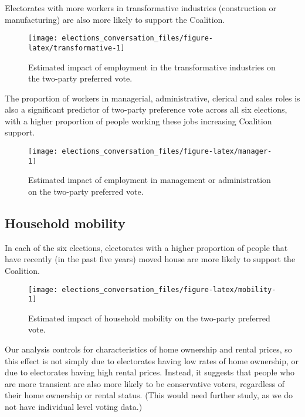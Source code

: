 \documentclass[11pt,a4paper,]{article}
\begin{document}
Electorates with more workers in transformative industries (construction or manufacturing) are also more likely to support the Coalition.

\begin{figure}[H]

{\centering \texttt{[image: elections\_conversation\_files/figure-latex/transformative-1]} 

}

\caption{Estimated impact of employment in the transformative industries on the two-party preferred vote.}\label{fig:transformative}
\end{figure}

The proportion of workers in managerial, administrative, clerical and sales roles is also a significant predictor of two-party preference vote across all six elections, with a higher proportion of people working these jobs increasing Coalition support.

\begin{figure}[H]

{\centering \texttt{[image: elections\_conversation\_files/figure-latex/manager-1]} 

}

\caption{Estimated impact of employment in management or administration on the two-party preferred vote.}\label{fig:manager}
\end{figure}

\hypertarget{household-mobility}{%
\subsection*{Household mobility}\label{household-mobility}}

In each of the six elections, electorates with a higher proportion of people that have recently (in the past five years) moved house are more likely to support the Coalition.

\begin{figure}[H]

{\centering \texttt{[image: elections\_conversation\_files/figure-latex/mobility-1]} 

}

\caption{Estimated impact of household mobility on the two-party preferred vote.}\label{fig:mobility}
\end{figure}

Our analysis controls for characteristics of home ownership and rental prices, so this effect is not simply due to electorates having low rates of home ownership, or due to electorates having high rental prices. Instead, it suggests that people who are more transient are also more likely to be conservative voters, regardless of their home ownership or rental status. (This would need further study, as we do not have individual level voting data.)
\end{document}
